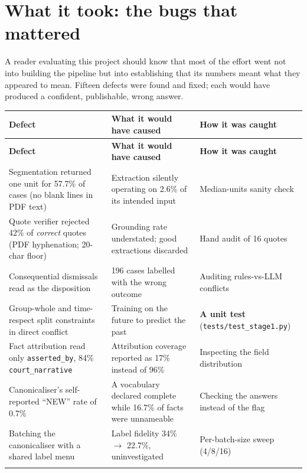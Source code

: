 \documentclass[12pt,a4paper]{article}
\newcommand{\code}[1]{\texttt{\small #1}}
\begin{document}
\section{What it took: the bugs that mattered}\label{sec:engineering}

A reader evaluating this project should know that most of the effort went not into building the
pipeline but into establishing that its numbers meant what they appeared to mean. Fifteen defects
were found and fixed; each would have produced a confident, publishable, wrong answer.

{\small
\begin{longtable}{@{}p{4.6cm}p{5.2cm}p{4.4cm}@{}}
\toprule
\textbf{Defect} & \textbf{What it would have caused} & \textbf{How it was caught} \\
\midrule
\endfirsthead
\toprule
\textbf{Defect} & \textbf{What it would have caused} & \textbf{How it was caught} \\
\midrule
\endhead
Segmentation returned one unit for 57.7\% of cases (no blank lines in PDF text)
 & Extraction silently operating on 2.6\% of its intended input
 & Median-units sanity check \\
\addlinespace
Quote verifier rejected 42\% of \emph{correct} quotes (PDF hyphenation; 20-char floor)
 & Grounding rate understated; good extractions discarded
 & Hand audit of 16 quotes \\
\addlinespace
Consequential dismissals read as the disposition
 & 196 cases labelled with the wrong outcome
 & Auditing rules-vs-LLM conflicts \\
\addlinespace
Group-whole and time-respect split constraints in direct conflict
 & Training on the future to predict the past
 & \textbf{A unit test} (\code{tests/test\_stage1.py}) \\
\addlinespace
Fact attribution read only \code{asserted\_by}, 84\% \code{court\_narrative}
 & Attribution coverage reported as 17\% instead of 96\%
 & Inspecting the field distribution \\
\addlinespace
Canonicaliser's self-reported ``NEW'' rate of 0.7\%
 & A vocabulary declared complete while 16.7\% of facts were unnameable
 & Checking the answers instead of the flag \\
\addlinespace
Batching the canonicaliser with a shared label menu
 & Label fidelity 34\% $\rightarrow$ 22.7\%, uninvestigated
 & Per-batch-size sweep (4/8/16) \\
\addlinespace

\end{longtable}}
\end{document}
